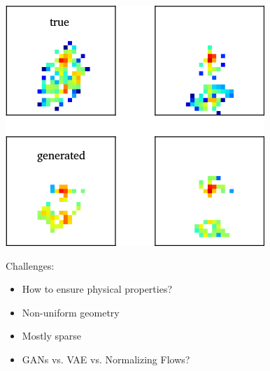 \documentclass{beamer}
\begin{document}
\begin{frame}
\begin{columns}
\begin{column}{0.3\textwidth}
\begin{center}
                \includegraphics[width=\textwidth]{figures/lagan2.png}
            \end{center}

            \scriptsize
            Challenges:
            \begin{itemize}
                \item How to ensure physical properties?
                \item Non-uniform geometry
                \item Mostly sparse
                \item GANs vs. VAE vs. Normalizing Flows?
            \end{itemize}
        \end{column}
    \end{columns}

\end{frame}
\end{document}
